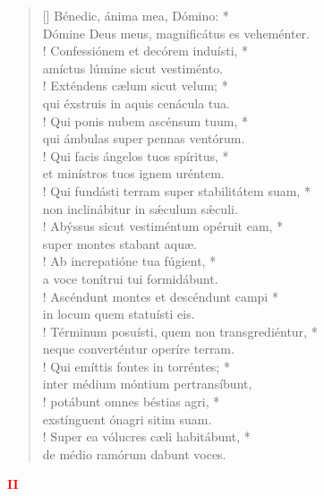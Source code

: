\begin{verse}[\versewidth]
Bénedic, ánima mea, Dómino: *\\
Dómine Deus meus, magnificátus es veheménter.\\!
\vin Confessiónem et decórem induísti, *\\
\vin amíctus lúmine sicut vestiménto.\\!
Exténdens cælum sicut velum; *\\
qui éxstruis in aquis cenácula tua.\\!
\vin Qui ponis nubem ascénsum tuum, *\\
\vin qui ámbulas super pennas ventórum.\\!
Qui facis ángelos tuos spíritus, *\\
et minístros tuos ignem uréntem.\\!
\vin Qui fundásti terram super stabilitátem suam, *\\
\vin non inclinábitur in s\'{æ}culum s\'{æ}culi.\\!
Abýssus sicut vestiméntum opéruit eam, *\\
super montes stabant aquæ.\\!
\vin Ab increpatióne tua fúgient, *\\
\vin a voce tonítrui tui formidábunt.\\!
Ascéndunt montes et descéndunt campi *\\
in locum quem statuísti eis.\\!
\vin Términum posuísti, quem non transgrediéntur, *\\
\vin neque converténtur operíre terram.\\!
Qui emíttis fontes in torréntes; *\\
inter médium móntium pertransíbunt,\\!
\vin potábunt omnes béstias agri, *\\
\vin exstínguent ónagri sitim suam.\\!
Super ea vólucres cæli habitábunt, *\\
de médio ramórum dabunt voces.\\
\end{verse}
\begin{center}
\textcolor{red}{\bf II}
\end{center}

